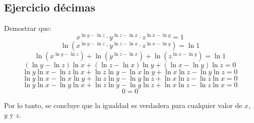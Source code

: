 \documentclass{templateNote}
\begin{document}
\subsection*{Ejercicio décimas}
Demostrar que:
\[x^{\ln y - \ln z} \cdot y^{\ln z - \ln x} \cdot z^{\ln x - \ln y} = 1\]
\[\ln (x^{\ln y - \ln z} \cdot y^{\ln z - \ln x} \cdot z^{\ln x - \ln y}) = \ln 1\]
\[\ln (x^{\ln y - \ln z}) + \ln (y^{\ln z - \ln x}) + \ln (z^{\ln x - \ln y}) = \ln 1\]
\[(\ln y - \ln z)\ln x + (\ln z - \ln x)\ln y + (\ln x - \ln y)\ln z = 0\]
\[\ln y \ln x - \ln z \ln x + \ln z \ln y - \ln x \ln y + \ln x \ln z - \ln y \ln z = 0\]
\[\ln y \ln x - \ln x \ln y + \ln z \ln y - \ln y \ln z + \ln x \ln z - \ln z \ln x = 0\]
\[\ln y \ln x - \ln y \ln x + \ln z \ln y - \ln y \ln z + \ln x \ln z - \ln z \ln x = 0\]
\[0 = 0\]

Por lo tanto, se concluye que la igualdad es verdadera para cualquier valor de $x$, $y$ y $z$.
\end{document}
